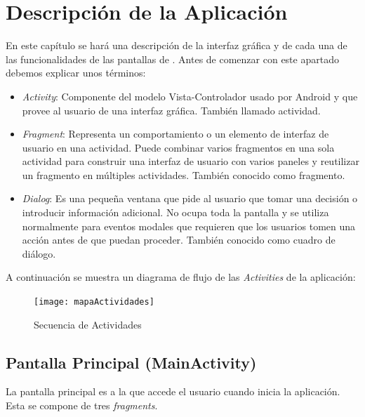 %
%
%
%

\cleardoublepage
\chapter{Descripción de la Aplicación}
\label{chap:description}

	En este capítulo se hará una descripción de la interfaz gráfica y de cada una de las funcionalidades de las pantallas de \CollegeApp. Antes de comenzar con este apartado debemos explicar unos términos:
	
	\begin{itemize}
		\item {\it Activity}: Componente del modelo Vista-Controlador usado por Android y que provee al usuario de una interfaz gráfica. También llamado actividad.
		\item {\it Fragment}: Representa un comportamiento o un elemento de interfaz de usuario en una actividad. Puede combinar varios fragmentos en una sola actividad para construir una interfaz de usuario con varios paneles y reutilizar un fragmento en múltiples actividades. También conocido como fragmento.
		\item {\it Dialog}: Es una pequeña ventana que pide al usuario que tomar una decisión o introducir información adicional. No ocupa toda la pantalla y se utiliza normalmente para eventos modales que requieren que los usuarios tomen una acción antes de que puedan proceder. También conocido como cuadro de diálogo.
	\end{itemize}
	
	A continuación se muestra un diagrama de flujo de las {\it Activities} de la aplicación:
	
	\begin{figure}[h !]
		\centering
		\texttt{[image: mapaActividades]}
		\caption{Secuencia de Actividades}
		\label{fig:ActivitiesSecuence}
	\end{figure}
	
	\newpage
	\section{Pantalla Principal (MainActivity)}
		La pantalla principal es a la que accede el usuario cuando inicia la aplicación. Esta se compone de tres {\it fragments}.
		
